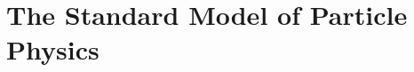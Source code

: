 \documentclass[10pt]{book}
\renewcommand{\(}{\left(}
\renewcommand{\)}{\right)}
\renewcommand{\[}{\left[}
\renewcommand{\]}{\right]}
\begin{document}


%





\chapter{The Standard Model of Particle Physics}
\label{Chap:SM}
\end{document}
